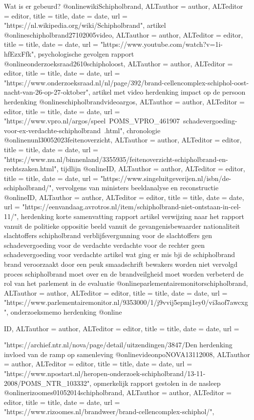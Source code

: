 {{Wat is er gebeurd?
@online{wikiSchipholbrand,	ALTauthor = {author},	ALTeditor = {editor},	title = {title},	date = {date},	url = {"https://nl.wikipedia.org/wiki/Schipholbrand"},}
artikel
@online{schipholbrand27102005video,	ALTauthor = {author},	ALTeditor = {editor},	title = {title},	date = {date},	url = {"https://www.youtube.com/watch?v=1i-hfEzxFfk"},}
psychologische gevolgen
rapport
@online{onderzoeksraad2610schipholoost,	ALTauthor = {author},	ALTeditor = {editor},	title = {title},	date = {date},	url = {"https://www.onderzoeksraad.nl/nl/page/392/brand-cellencomplex-schiphol-oost-nacht-van-26-op-27-oktober"},}
artikel met video
herdenking
impact op de persoon
herdenking
@online{schipholbrandvideoargos,	ALTauthor = {author},	ALTeditor = {editor},	title = {title},	date = {date},	url = {"https://www.vpro.nl/argos/speel~POMS_VPRO_461907~schadevergoeding-voor-ex-verdachte-schipholbrand~.html"},}
chronologie
@online{nunl30052023feitenoverzicht,	ALTauthor = {author},	ALTeditor = {editor},	title = {title},	date = {date},	url = {"https://www.nu.nl/binnenland/3355935/feitenoverzicht-schipholbrand-en-rechtszaken.html"},}
tijdlijn
@online{ID,	ALTauthor = {author},	ALTeditor = {editor},	title = {title},	date = {date},	url = {"https://www.singeluitgeverijen.nl/isbn/de-schipholbrand/"},}
vervolgens van ministers
beeldanalyse en reconstructie
@online{ID,	ALTauthor = {author},	ALTeditor = {editor},	title = {title},	date = {date},	url = {"https://eenvandaag.avrotros.nl/item/schipholbrand-niet-ontstaan-in-cel-11/"},}
herdenking
korte samenvatting
rapport
artikel
verwijzing naar het rapport vanuit de politieke oppositie
beeld vanuit de gevangenisbewaarder
nationaliteit slachtoffers schipholbrand
verblijfsvergunning voor de slachtoffers
gen schadevergoeding voor de verdachte
verdachte voor de rechter
geen schadevergoeding voor verdachte
artikel wat ging er mis bji de schipholbrand
brand veroorzaakt door een peuk
smaadschrift
bewakers worden niet vervolgd
proces schipholbrand moet over en de brandveilgheid moet worden verbeterd
de rol van het parlement in de evaluatie
@online{parlementairemonitorschipholbrand,	ALTauthor = {author},	ALTeditor = {editor},	title = {title},	date = {date},	url = {"https://www.parlementairemonitor.nl/9353000/1/j9vvij5epmj1ey0/vi3aof7awcxg"},}
onderzoeksmemo
herdenking
@online{ID,	ALTauthor = {author},	ALTeditor = {editor},	title = {title},	date = {date},	url = {"https://archief.ntr.nl/nova/page/detail/uitzendingen/3847/Den%
herdenking
invloed van de ramp op samenleving
@online{videonpoNOVA13112008,	ALTauthor = {author},	ALTeditor = {editor},	title = {title},	date = {date},	url = {"https://www.npostart.nl/heropen-onderzoek-schipholbrand/13-11-2008/POMS_NTR_103332"},}
opmerkelijk rapport gestolen in de nasleep
@online{rizoomes01052014schipholbrand,	ALTauthor = {author},	ALTeditor = {editor},	title = {title},	date = {date},	url = {"https://www.rizoomes.nl/brandweer/brand-cellencomplex-schiphol/"},}



}}}}
